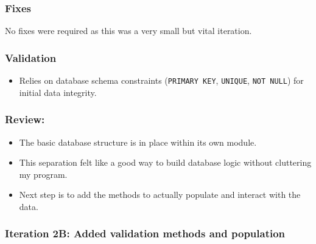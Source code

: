 \subsubsection{Fixes}
No fixes were required as this was a very small but vital iteration.

\subsubsection{Validation}
\begin{itemize}
	\item Relies on database schema constraints (\verb|PRIMARY KEY|, \verb|UNIQUE|, \verb|NOT NULL|) for initial data integrity.
\end{itemize}

\subsubsection{Review:}
\begin{itemize}
	\item The basic database structure is in place within its own module.
	\item This separation felt like a good way to build database logic without cluttering my program.
	\item Next step is to add the methods to actually populate and interact with the data.
\end{itemize}

\newpage

\subsubsection{Iteration 2B: Added validation methods and population}

